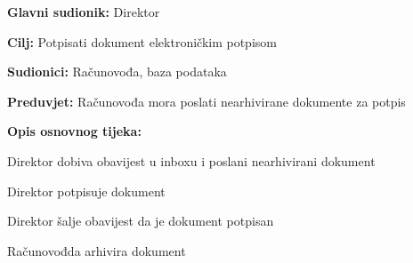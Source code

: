 				\noindent {}
				\begin{packed_item}
					
					\item \textbf{Glavni sudionik:} Direktor
					\item  \textbf{Cilj:} Potpisati dokument elektroničkim potpisom
					\item  \textbf{Sudionici:} Računovođa, baza podataka
					\item  \textbf{Preduvjet:} Računovođa mora poslati nearhivirane dokumente za potpis
					\item  \textbf{Opis osnovnog tijeka:}
					
					\item[] \begin{packed_enum}
						
						\item Direktor dobiva obavijest u inboxu i poslani nearhivirani dokument
						\item Direktor potpisuje dokument
						\item Direktor šalje obavijest da je dokument potpisan 
						\item Računovođda arhivira dokument
						
						
					\end{packed_enum}
					
				\end{packed_item}
			
